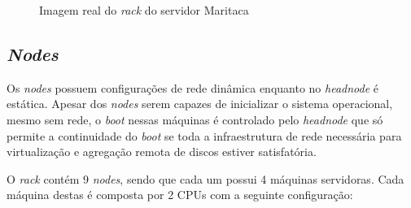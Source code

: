 \begin{figure}[!htb]
\centering
{}
\quad %
\caption{Imagem real do \textit{rack} do servidor Maritaca}
\label{fig:real}
\end{figure}




\subsection{\textit{Nodes}}

Os \textit{nodes} possuem configurações de rede dinâmica enquanto no \textit{headnode} é estática. Apesar dos \textit{nodes} serem capazes de inicializar o sistema operacional, mesmo sem rede, o \textit{boot} nessas máquinas é controlado pelo \textit{headnode} que só permite a continuidade do \textit{boot} se toda a infraestrutura de rede necessária para virtualização e agregação remota de discos estiver satisfatória.

O \textit{rack} contém 9 \textit{nodes}, sendo que cada um possui 4 máquinas servidoras. Cada máquina destas é composta por 2 CPUs com a seguinte configuração: 

